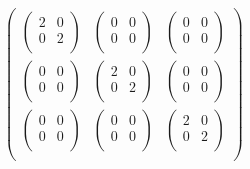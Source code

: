 \documentclass[11pt]{article}
\begin{document}
\begin{enumerate}
        \begin{doublespace}
            \noindent\(\left(
            \begin{array}{ccc}
                \left(
                \begin{array}{cc}
                    2 & 0 \\
                    0 & 2 \\
                \end{array}
                \right) & \left(
                \begin{array}{cc}
                    0 & 0 \\
                    0 & 0 \\
                \end{array}
                \right) & \left(
                \begin{array}{cc}
                    0 & 0 \\
                    0 & 0 \\
                \end{array}
                \right) \\
                \left(
                \begin{array}{cc}
                    0 & 0 \\
                    0 & 0 \\
                \end{array}
                \right) & \left(
                \begin{array}{cc}
                    2 & 0 \\
                    0 & 2 \\
                \end{array}
                \right) & \left(
                \begin{array}{cc}
                    0 & 0 \\
                    0 & 0 \\
                \end{array}
                \right) \\
                \left(
                \begin{array}{cc}
                    0 & 0 \\
                    0 & 0 \\
                \end{array}
                \right) & \left(
                \begin{array}{cc}
                    0 & 0 \\
                    0 & 0 \\
                \end{array}
                \right) & \left(
                \begin{array}{cc}
                    2 & 0 \\
                    0 & 2 \\
                \end{array}
                \right) \\
            \end{array}
            \right)\)
        \end{doublespace}


\end{enumerate}
\end{document}

